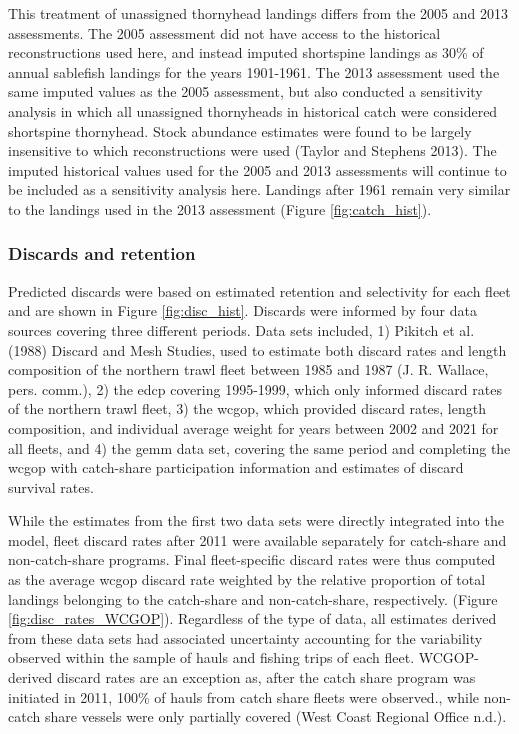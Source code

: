 \documentclass[11pt,
  english,
  letterpaper,
]{article}
\begin{document}
This treatment of unassigned thornyhead landings differs from the 2005 and 2013 assessments. The 2005 assessment did not have access to the historical reconstructions used here, and instead imputed shortspine landings as 30\% of annual sablefish landings for the years 1901-1961. The 2013 assessment used the same imputed values as the 2005 assessment, but also conducted a sensitivity analysis in which all unassigned thornyheads in historical catch were considered shortspine thornyhead. Stock abundance estimates were found to be largely insensitive to which reconstructions were used (Taylor and Stephens 2013). The imputed historical values used for the 2005 and 2013 assessments will continue to be included as a sensitivity analysis here. Landings after 1961 remain very similar to the landings used in the 2013 assessment (Figure \ref{fig:catch_hist}).

\hypertarget{discards-and-retention}{%
\subsubsection{Discards and retention}\label{discards-and-retention}}

Predicted discards were based on estimated retention and selectivity for each fleet and are shown in Figure \ref{fig:disc_hist}. Discards were informed by four data sources covering three different periods. Data sets included, 1) Pikitch et al. (1988) Discard and Mesh Studies, used to estimate both discard rates and length composition of the northern trawl fleet between 1985 and 1987 (J. R. Wallace, pers. comm.), 2) the \gls{edcp} covering 1995-1999, which only informed discard rates of the northern trawl fleet, 3) the \gls{wcgop}, which provided discard rates, length composition, and individual average weight for years between 2002 and 2021 for all fleets, and 4) the \gls{gemm} data set, covering the same period and completing the \gls{wcgop} with catch-share participation information and estimates of discard survival rates.

While the estimates from the first two data sets were directly integrated into the model, fleet discard rates after 2011 were available separately for catch-share and non-catch-share programs. Final fleet-specific discard rates were thus computed as the average \gls{wcgop} discard rate weighted by the relative proportion of total landings belonging to the catch-share and non-catch-share, respectively. (Figure \ref{fig:disc_rates_WCGOP}). Regardless of the type of data, all estimates derived from these data sets had associated uncertainty accounting for the variability observed within the sample of hauls and fishing trips of each fleet. WCGOP-derived discard rates are an exception as, after the catch share program was initiated in 2011, 100\% of hauls from catch share fleets were observed., while non-catch share vessels were only partially covered (West Coast Regional Office n.d.).
\end{document}
